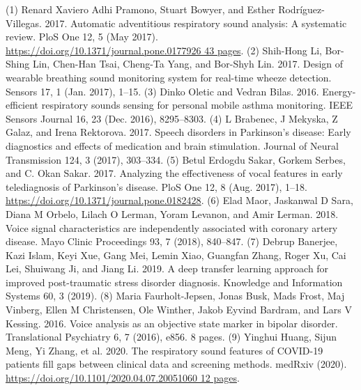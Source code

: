 \documentclass{nle}
\begin{document}
\appendix

\begin{thebibliography}{}
   (1) Renard Xaviero Adhi Pramono, Stuart Bowyer, and Esther Rodríguez-Villegas. 2017. Automatic adventitious respiratory sound analysis: A systematic review. PloS One 12, 5 (May 2017). \url{https://doi.org/10.1371/journal.pone.0177926 43 pages}.
   (2) Shih-Hong Li, Bor-Shing Lin, Chen-Han Tsai, Cheng-Ta Yang, and Bor-Shyh Lin. 2017. Design of wearable breathing sound monitoring system for real-time wheeze detection. Sensors 17, 1 (Jan. 2017), 1–15.
   (3) Dinko Oletic and Vedran Bilas. 2016. Energy-efficient respiratory sounds sensing for personal mobile asthma monitoring. IEEE Sensors Journal 16, 23 (Dec. 2016), 8295–8303.
   (4) L Brabenec, J Mekyska, Z Galaz, and Irena Rektorova. 2017. Speech disorders in Parkinson’s disease: Early diagnostics and effects of medication and brain stimulation. Journal of Neural Transmission 124, 3 (2017), 303–334.
   (5) Betul Erdogdu Sakar, Gorkem Serbes, and C. Okan Sakar. 2017. Analyzing the effectiveness of vocal features in early telediagnosis of Parkinson’s disease. PloS One 12, 8 (Aug. 2017), 1–18. \url{https://doi.org/10.1371/journal.pone.0182428}.
   (6) Elad Maor, Jaskanwal D Sara, Diana M Orbelo, Lilach O Lerman, Yoram Levanon, and Amir Lerman. 2018. Voice signal characteristics are independently associated with coronary artery disease. Mayo Clinic Proceedings 93, 7 (2018), 840–847.
   (7) Debrup Banerjee, Kazi Islam, Keyi Xue, Gang Mei, Lemin Xiao, Guangfan Zhang, Roger Xu, Cai Lei, Shuiwang Ji, and Jiang Li. 2019. A deep transfer learning approach for improved post-traumatic stress disorder diagnosis. Knowledge and Information Systems 60, 3 (2019).
   (8) Maria Faurholt-Jepsen, Jonas Busk, Mads Frost, Maj Vinberg, Ellen M Christensen, Ole Winther, Jakob Eyvind Bardram, and Lars V Kessing. 2016. Voice analysis as an objective state marker in bipolar disorder. Translational Psychiatry 6, 7 (2016), e856. 8 pages.
   (9) Yinghui Huang, Sijun Meng, Yi Zhang, et al. 2020. The respiratory sound features of COVID-19 patients fill gaps between clinical data and screening methods. medRxiv (2020). \url{https://doi.org/10.1101/2020.04.07.20051060 12 pages}.

\end{thebibliography}
\end{document}

